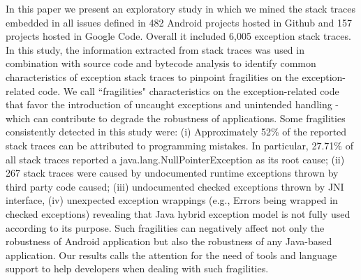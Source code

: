 \documentclass[conference]{IEEEtran}
\begin{document}
In this paper we present an exploratory study in which we mined the stack 
traces embedded in all issues defined in 482 Android projects hosted in Github and 
157 projects hosted in Google Code. Overall it included 6,005 exception stack traces.
In this study, the information extracted from stack traces was used in combination 
with source code and bytecode analysis to identify common characteristics of exception 
stack traces to pinpoint fragilities on the exception-related code. 
We call ``fragilities" characteristics on the exception-related code that favor the introduction
of  uncaught exceptions and unintended handling - which can contribute to 
degrade the robustness of applications.
Some fragilities consistently detected in this study were: 
(i) Approximately 52\% of the reported stack traces can be attributed to programming mistakes. 
In particular, 27.71\% of all stack traces reported a java.lang.NullPointerException as its root cause;
(ii) 267 stack traces were caused by undocumented runtime exceptions thrown by third party code caused;
(iii) undocumented checked exceptions thrown by JNI interface,
(iv) unexpected exception wrappings (e.g., Errors being wrapped in checked exceptions) 
revealing that Java hybrid exception model is not fully used according to its purpose.
Such fragilities can negatively affect not only the robustness of Android application 
but also the robustness of any Java-based application. 
Our results calls the attention for the need of tools and language support to help 
developers when dealing with such fragilities.

 








\end{document}
